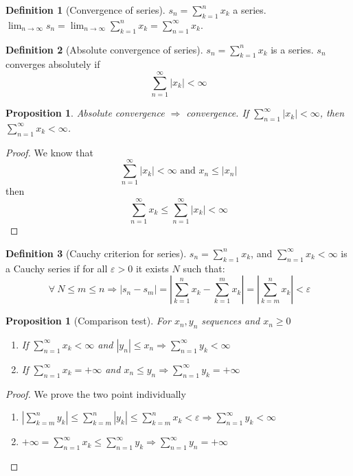 \documentclass{article}
\newcommand{\DS}{\displaystyle}
\newcommand{\abs}[1]{\left|#1\right|}
\newcommand{\Ar}{\Rightarrow}
\newenvironment{enumrom}{\begin{enumerate}[label=(\roman*)]}{\end{enumerate}}
\newcommand{\limn}{\lim_{n \to \infty}}
\theoremstyle{definition}
\newtheorem{definition}{Definition}[section]
\theoremstyle{definition}
\theoremstyle{plain}
\theoremstyle{plain}
\theoremstyle{plain}
\theoremstyle{plain}
\newtheorem{proposition}[theorem]{Proposition}
\theoremstyle{definition}
\theoremstyle{remark}
\theoremstyle{remark}
\theoremstyle{remark}
\theoremstyle{remark}
\newcommand{\sumn}{\sum_{k=1}^n}
\newcommand{\series}{\sum_{n=1}^\infty}
\newcommand{\seriec}{\sum_{k=m}^n}
\newcommand{\ForAll}{\ \forall \ }
\newcommand{\E}{\varepsilon}
\begin{document}
\begin{definition}[Convergence of series]
  $\DS s_n = \sumn{x_k}$ a series. $\DS \limn s_n = \limn \sumn{x_k} = \series{x_k}$.
\end{definition}



\begin{definition}[Absolute convergence of series]
  $\DS s_n = \sumn{x_k}$ is a series. $s_n$ converges absolutely if
  \[\DS \series{\abs{x_k}} < \infty\]
\end{definition}


\begin{proposition}
  Absolute convergence $\Ar$ convergence. If $\DS \series{\abs{x_k}} < \infty$, then $\DS \series{x_k} < \infty$.
\end{proposition}

\begin{proof}
  We know that
  \[\series{\abs{x_k}} < \infty \text{ and } x_n \leq \abs{x_n}\]
  then
  \[ \series{x_k} \leq \series{\abs{x_k}} < \infty\]
\end{proof}


\begin{definition}[Cauchy criterion for series]
  $\DS s_n = \sumn{x_k}$, and $\DS \series{x_k} < \infty$ is a Cauchy series if for all $\E > 0$ it exists $N$ such that:
  \[
    \ForAll N \leq m \leq n \Ar \abs{s_n - s_m} =
    \abs{\sumn{x_k} - \sum_{k=1}^m x_k} = \abs{\sum_{k=m}^n x_k} < \E
  \]
\end{definition}


\begin{proposition}[Comparison test]
  For $x_n, y_n$ sequences and $x_n \geq 0$
  \begin{enumrom}
    \item If $\DS \series{x_k} < \infty$ and $\abs{y_n} \leq x_n \DS \Ar \series{y_k} < \infty$
    \item If $\DS \series{x_k} = +\infty$ and $x_n \leq y_n \DS \Ar \series{y_k} = +\infty$
  \end{enumrom}
\end{proposition}

\begin{proof}
  We prove the two point individually
  \begin{enumrom}
    \item $\DS \abs{\seriec{y_k}} \leq \seriec{\abs{y_k}} \leq \seriec{x_k} < \E \Ar \series{y_k} < \infty$
    \item $\DS +\infty = \series{x_k} \leq \series{y_k} \Ar \series{y_n} = +\infty$
  \end{enumrom}
\end{proof}
\end{document}
